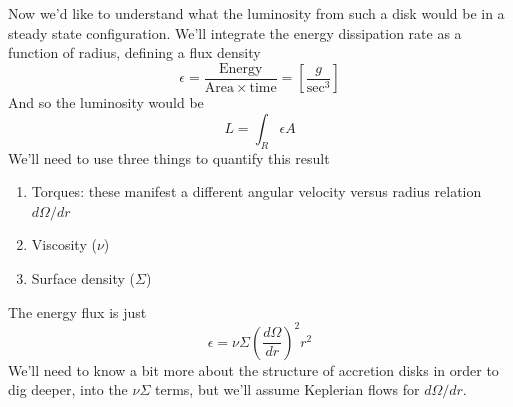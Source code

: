 \documentclass[10pt]{article}
\numberwithin{equation}{section}
\newcommand{\n}{\noindent}
\begin{document}
	\n Now we'd like to understand what the luminosity from such a disk would be in a steady state configuration. We'll integrate the energy dissipation rate as a function of radius, defining a flux density
	\begin{equation}
		\label{eq:disk:13} \epsilon = \frac{\mathrm{Energy}}{\mathrm{Area\times time}} = \left[\frac{g}{\mathrm{sec}^3}\right]
	\end{equation}
	And so the luminosity would be
	\begin{equation}
		\label{eq:disk:14} L = \int_R \epsilon A
	\end{equation}
	We'll need to use three things to quantify this result
	\begin{enumerate}
		\item Torques: these manifest a different angular velocity versus radius relation $d\Omega/dr$
		\item Viscosity ($\nu$)
		\item Surface density ($\Sigma$)
	\end{enumerate}
	The energy flux is just 
	\begin{equation}
		\label{eq:disk:15} \epsilon = \nu\Sigma \left(\frac{d\Omega}{dr}\right)^2r^2
	\end{equation}
	We'll need to know a bit more about the structure of accretion disks in order to dig deeper, into the $\nu\Sigma$ terms, but we'll assume Keplerian flows for $d\Omega/dr$.
\end{document}
